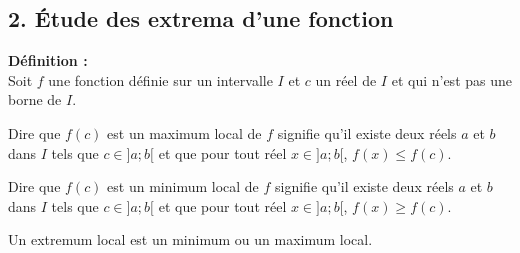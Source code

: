 \documentclass[11pt,a4paper]{article}
\begin{document}
\subsection*{2. Étude des extrema d'une fonction}

\begin{mdframed}[style=definitionStyle]
    \textbf{Définition :} ~\\
    Soit $f$ une fonction définie sur un intervalle $I$ et $c$ un réel de $I$ et qui n'est pas une borne de $I$.

    Dire que $f(c)$ est un maximum local de $f$ signifie qu'il existe deux réels $a$ et $b$ dans $I$ tels que $c\in]a;b[$ et que pour tout réel $x\in]a;b[$, $f(x) \leq f(c)$.

    Dire que $f(c)$ est un minimum local de $f$ signifie qu'il existe deux réels $a$ et $b$ dans $I$ tels que $c\in]a;b[$ et que pour tout réel $x\in]a;b[$, $f(x) \geq f(c)$.

    Un extremum local est un minimum ou un maximum local.
\end{mdframed}
\end{document}
